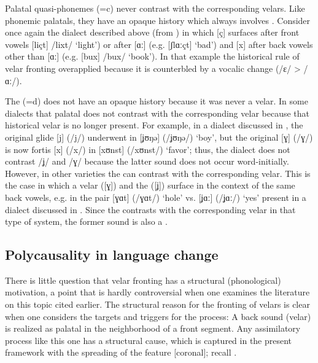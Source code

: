 \begin{xlist}
\begin{xlist}
Palatal quasi-phonemes (=c) never contrast with the corresponding velars. Like phonemic palatals, they have an opaque history which always involves . Consider once again the dialect described above (from ) in which [ç] surfaces after front vowels [liçt] /lixt/ ‘light’) or after [ɑː] (e.g. [ʃlɑːçt] ‘bad’) and [x] after back vowels other than [ɑː] (e.g. [bux] /bux/ ‘book’). In that example the historical rule of velar fronting overapplied because it is counterbled by a vocalic change (/ɛ/ > /ɑː/).

The  (=d) does not have an opaque history because it was never a velar. In some dialects that palatal does not contrast with the corresponding velar because that historical velar is no longer present. For example, in a dialect discussed in , the original glide [j] (/j/) underwent  in [ʝʊŋə] (/ʝʊŋə/) ‘boy’, but the original [ɣ] (/ɣ/) is now fortis [x] (/x/) in [xʊnst] (/xʊnst/) ‘favor’; thus, the dialect does not contrast /ʝ/ and /ɣ/ because the latter sound does not occur word-initially. However, in other varieties the  can contrast with the corresponding velar. This is the case in which a velar ([ɣ]) and the  ([ʝ]) surface in the context of the same back vowels, e.g. in the pair [ɣɑt] (/ɣɑt/) ‘hole’ vs. [ʝɑː] (/ʝɑː/) ‘yes’ present in a dialect discussed in . Since the  contrasts with the corresponding velar in that type of system, the former sound is also a .

\subsection{Polycausality in language change }\label{sec:2.4.4}

There is little question that velar fronting has a structural (phonological) motivation, a point that is hardly controversial when one examines the literature on this topic cited earlier. The structural reason for the fronting of velars is clear when one considers the targets and triggers for the process: A back sound (velar) is realized as palatal in the neighborhood of a front segment. Any assimilatory process like this one has a structural cause, which is captured in the present framework with the spreading of the feature [coronal]; recall .


\end{xlist}
\end{xlist}
